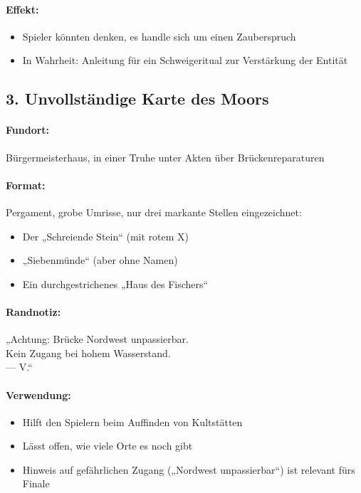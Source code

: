 \paragraph{Effekt:}
\begin{itemize}
\item Spieler könnten denken, es handle sich um einen Zauberspruch
\item In Wahrheit: Anleitung für ein Schweigeritual zur Verstärkung der Entität
\end{itemize}

\subsection*{3. Unvollständige Karte des Moors}
\paragraph{Fundort:} Bürgermeisterhaus, in einer Truhe unter Akten über Brückenreparaturen
\paragraph{Format:} Pergament, grobe Umrisse, nur drei markante Stellen eingezeichnet:
\begin{itemize}
\item Der „Schreiende Stein“ (mit rotem X)
\item „Siebenmünde“ (aber ohne Namen)
\item Ein durchgestrichenes „Haus des Fischers“
\end{itemize}
\paragraph{Randnotiz:}
\begin{displayquote}
„Achtung: Brücke Nordwest unpassierbar.\\
Kein Zugang bei hohem Wasserstand.\\
--- V.“
\end{displayquote}
\paragraph{Verwendung:}
\begin{itemize}
\item Hilft den Spielern beim Auffinden von Kultstätten
\item Lässt offen, wie viele Orte es noch gibt
\item Hinweis auf gefährlichen Zugang („Nordwest unpassierbar“) ist relevant fürs Finale
\end{itemize}

